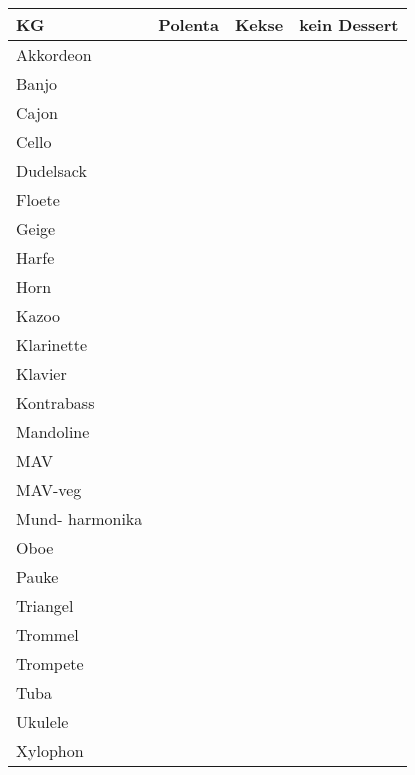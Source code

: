 \documentclass[14pt]{article}
\begin{document}
  \begin{tabular}{l|l|l|l}
    \toprule
    KG  &Polenta&Kekse&kein Dessert\\
    \midrule


Akkordeon&&&\\


Banjo&&&\\


Cajon&&&\\


Cello&&&\\


Dudelsack&&&\\


Floete&&&\\


Geige&&&\\


Harfe&&&\\


Horn&&&\\


Kazoo&&&\\


Klarinette&&&\\


Klavier&&&\\


Kontrabass&&&\\


Mandoline&&&\\

MAV&&&\\

MAV-veg&&&\\

Mund-
harmonika&&&\\


Oboe&&&\\


Pauke&&&\\


Triangel&&&\\


Trommel&&&\\


Trompete&&&\\


Tuba&&&\\


Ukulele&&&\\


    Xylophon&&&\\
    \bottomrule
\end{tabular}
\newpage
\end{document}

